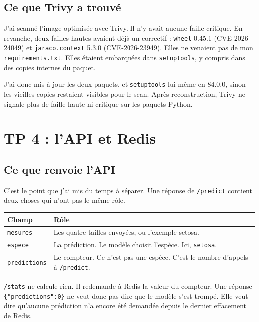 \documentclass[11pt,a4paper]{article}
\begin{document}
\subsection{Ce que Trivy a trouvé}

J'ai scanné l'image optimisée avec Trivy. Il n'y avait aucune faille critique. En revanche, deux failles hautes avaient déjà un correctif : \texttt{wheel} 0.45.1 (CVE-2026-24049) et \texttt{jaraco.context} 5.3.0 (CVE-2026-23949). Elles ne venaient pas de mon \texttt{requirements.txt}. Elles étaient embarquées dans \texttt{setuptools}, y compris dans des copies internes du paquet.

J'ai donc mis à jour les deux paquets, et \texttt{setuptools} lui-même en 84.0.0, sinon les vieilles copies restaient visibles pour le scan. Après reconstruction, Trivy ne signale plus de faille haute ni critique sur les paquets Python.

\section{TP 4 : l'API et Redis}

\subsection{Ce que renvoie l'API}

C'est le point que j'ai mis du temps à séparer. Une réponse de \texttt{/predict} contient deux choses qui n'ont pas le même rôle.

\begin{center}
\begin{tabular}{@{}lp{9.2cm}@{}}
\toprule
Champ & Rôle \\
\midrule
\texttt{mesures} & Les quatre tailles envoyées, ou l'exemple setosa. \\
\texttt{espece} & La prédiction. Le modèle choisit l'espèce. Ici, \texttt{setosa}. \\
\texttt{predictions} & Le compteur. Ce n'est pas une espèce. C'est le nombre d'appels à \texttt{/predict}. \\
\bottomrule
\end{tabular}
\end{center}

\texttt{/stats} ne calcule rien. Il redemande à Redis la valeur du compteur. Une réponse \texttt{\{"predictions":0\}} ne veut donc pas dire que le modèle s'est trompé. Elle veut dire qu'aucune prédiction n'a encore été demandée depuis le dernier effacement de Redis.
\end{document}
